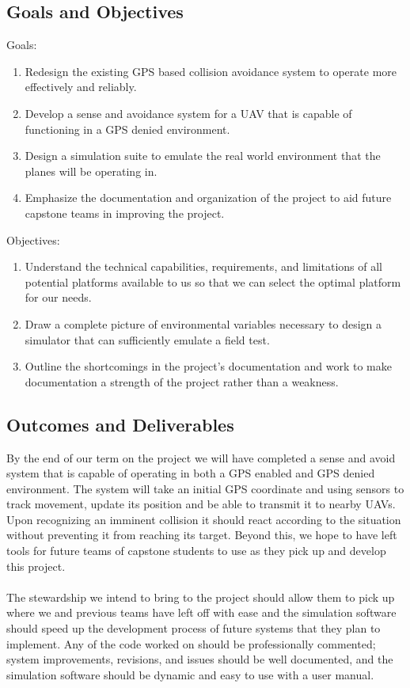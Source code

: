 \documentclass[12pt]{article}
\begin{document}
\subsection{Goals and Objectives}
Goals:
\begin{enumerate}
\item Redesign the existing GPS based collision avoidance system to operate more effectively and reliably.

\item Develop a sense and avoidance system for a UAV that is capable of functioning in a GPS denied environment.
\item Design a simulation suite to emulate the real world environment that the planes will be operating in.
\item Emphasize the documentation and organization of the project to aid future capstone teams in improving the project.
\end{enumerate}
Objectives:
\begin{enumerate}
\item Understand the technical capabilities, requirements, and limitations of all potential platforms available to us so that we can select the optimal platform for our needs.
\item Draw a complete picture of environmental variables necessary to design a simulator that can sufficiently emulate a field test.
\item Outline the shortcomings in the project's documentation and work to make documentation a strength of the project rather than a weakness.
\end{enumerate}

\subsection{Outcomes and Deliverables}
By the end of our term on the project we will have completed a sense and avoid system that is capable of operating in both a GPS enabled and GPS denied environment. The system will take an initial GPS coordinate and using sensors to track movement, update its position and be able to transmit it to nearby UAVs. Upon recognizing an imminent collision it should react according to the situation without preventing it from reaching its target. Beyond this, we hope to have left tools for future teams of capstone students to use as they pick up and develop this project.\\\\
The stewardship we intend to bring to the project should allow them to pick up where we and previous teams have left off with ease and the simulation software should speed up the development process of future systems that they plan to implement. Any of the code worked on should be professionally commented; system improvements, revisions, and issues should be well documented, and the simulation software should be dynamic and easy to use with a user manual.
\end{document}
